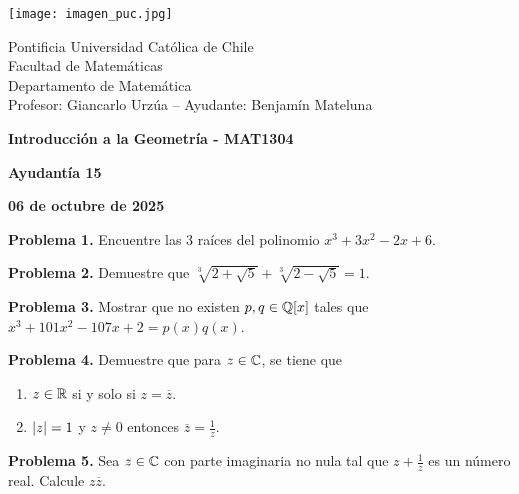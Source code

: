 \documentclass{article}
\begin{document}
\begin{minipage}{2.5cm}
    \texttt{[image: imagen\_puc.jpg]}
\end{minipage}
\begin{minipage}{14cm}
    {\sc Pontificia Universidad Católica de Chile\\
    Facultad de Matemáticas\\
    Departamento de Matemática\\
    Profesor: Giancarlo Urzúa -- Ayudante: Benjamín Mateluna}
\end{minipage}
\vspace{1ex}

{\centerline{\bf Introducción a la Geometría - MAT1304}
\centerline{\bf Ayudantía 15}}
\centerline{\bf 06 de octubre de 2025}

\vspace{1cm}
\noindent\textbf{Problema 1.} Encuentre las 3 raíces del polinomio $x^{3}+3x^{2}-2x+6$.

\vspace{5mm}
\noindent\textbf{Problema 2.} Demuestre que $\sqrt[3]{2+\sqrt{5}}+\sqrt[3]{2-\sqrt{5}}=1$.

\vspace{5mm}
\noindent\textbf{Problema 3.} Mostrar que no existen $p,q\in\mathbb{Q}[x]$ tales que 
$x^{3}+101x^{2}-107x+2=p(x)q(x)$.

\vspace{5mm}
\noindent\textbf{Problema 4.} Demuestre que para $z\in\mathbb{C}$, se tiene que
\begin{enumerate}
    \item $z\in\mathbb{R}$ si y solo si $z=\overline{z}$.
    \item $\left|z \right|=1$ y $z\neq0$ entonces $\overline{z}=\frac{1}{z}$.
\end{enumerate}

\vspace{5mm}
\noindent\textbf{Problema 5.} Sea $z\in\mathbb{C}$ con parte imaginaria no nula tal que $z+\frac{1}{z}$ es 
un número real. Calcule $z\overline{z}$.

\end{document}
